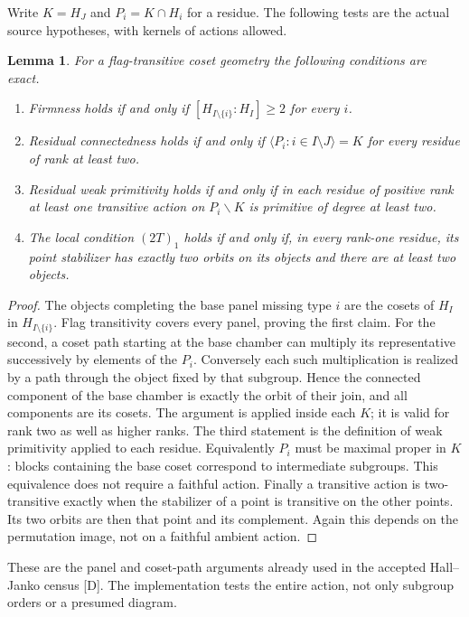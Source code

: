 \documentclass[11pt]{article}
\newtheorem{lemma}[theorem]{Lemma}
\begin{document}
Write $K=H_J$ and $P_i=K\cap H_i$ for a residue. The following tests
are the actual source hypotheses, with kernels of actions allowed.
\begin{lemma}\label{filters}
For a flag-transitive coset geometry the following conditions are exact.
\begin{enumerate}
\item Firmness holds if and only if $[H_{I\setminus\{i\}}:H_I]\ge2$
for every $i$.
\item Residual connectedness holds if and only if
$\langle P_i:i\in I\setminus J\rangle=K$ for every residue of rank
at least two.
\item Residual weak primitivity holds if and only if in each residue of
positive rank at least one transitive action on $P_i\backslash K$ is
primitive of degree at least two.
\item The local condition $(2T)_1$ holds if and only if, in every
rank-one residue, its point stabilizer has exactly two orbits on its
objects and there are at least two objects.
\end{enumerate}
\end{lemma}
\begin{proof}
The objects completing the base panel missing type $i$ are the cosets
of $H_I$ in $H_{I\setminus\{i\}}$. Flag transitivity covers every panel,
proving the first claim. For the second, a coset path starting at the base
chamber can multiply its representative successively by elements of the
$P_i$. Conversely each such multiplication is realized by a path through
the object fixed by that subgroup. Hence the connected component of the
base chamber is exactly the orbit of their join, and all components are
its cosets. The argument is applied inside each $K$; it is valid for
rank two as well as higher ranks. The third statement is the definition
of weak primitivity applied to each residue. Equivalently $P_i$ must be
maximal proper in $K$: blocks containing the base coset correspond to
intermediate subgroups. This equivalence does not require a faithful
action. Finally a transitive action is two-transitive exactly when the
stabilizer of a point is transitive on the other points. Its two orbits
are then that point and its complement. Again this depends on the
permutation image, not on a faithful ambient action.
\end{proof}
These are the panel and coset-path arguments already used in the accepted
Hall--Janko census [D]. The implementation tests the entire action, not
only subgroup orders or a presumed diagram.
\end{document}
